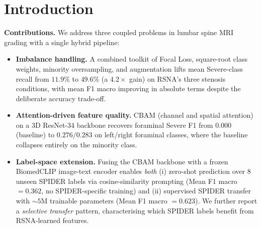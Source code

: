 \section{Introduction}
\label{sec:intro}



\textbf{Contributions.} We address three coupled problems in lumbar
spine MRI grading with a single hybrid pipeline:
\begin{itemize}
  \item \textbf{Imbalance handling.} A combined toolkit of Focal Loss,
        square-root class weights, minority oversampling, and
        augmentation lifts mean Severe-class recall from $11.9\%$ to
        $49.6\%$ (a $4.2\times$ gain) on RSNA's three stenosis
        conditions, with mean F1 macro improving in absolute terms
        despite the deliberate accuracy trade-off.
  \item \textbf{Attention-driven feature quality.} CBAM (channel and
        spatial attention) on a 3D ResNet-34 backbone recovers
        foraminal Severe F1 from $0.000$ (baseline) to
        $0.276/0.283$ on left/right foraminal classes, where the
        baseline collapses entirely on the minority class.
  \item \textbf{Label-space extension.} Fusing the CBAM backbone
        with a frozen BiomedCLIP image-text encoder enables
        \emph{both} (i) zero-shot prediction over $8$ unseen SPIDER
        labels via cosine-similarity prompting (Mean F1 macro
        $= 0.362$, no SPIDER-specific training) and (ii) supervised
        SPIDER transfer with ${\sim}5$M trainable parameters
        (Mean F1 macro $= 0.623$). We further report a
        \emph{selective transfer} pattern, characterising which
        SPIDER labels benefit from RSNA-learned features.
\end{itemize}

